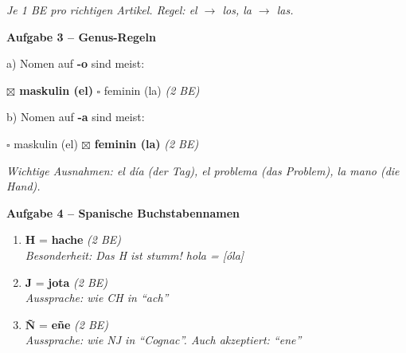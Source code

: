 \documentclass[11pt, a4paper]{article}
\newcommand{\punktebox}[1]{\hfill\fbox{\small \_\_\_/#1}}
\newcommand{\lsg}[1]{\textcolor{loesung}{\textbf{#1}}}
\begin{document}
\vspace{5pt}
\textit{Je 1 BE pro richtigen Artikel. Regel: el $\to$ los, la $\to$ las.}

\vspace{15pt}


\noindent\textbf{\textcolor{spanisch}{Aufgabe 3 -- Genus-Regeln}} \punktebox{4}

\vspace{10pt}

\noindent
a) Nomen auf \textbf{-o} sind meist:

\hspace{1cm} \lsg{$\boxtimes$ maskulin (el)} \hspace{2cm} $\square$ feminin (la) \hfill \textit{(2 BE)}

\vspace{0.8em}

\noindent
b) Nomen auf \textbf{-a} sind meist:

\hspace{1cm} $\square$ maskulin (el) \hspace{2cm} \lsg{$\boxtimes$ feminin (la)} \hfill \textit{(2 BE)}

\vspace{5pt}
\textit{Wichtige Ausnahmen: el día (der Tag), el problema (das Problem), la mano (die Hand).}

\vspace{15pt}


\noindent\textbf{\textcolor{spanisch}{Aufgabe 4 -- Spanische Buchstabennamen}} \punktebox{6}

\vspace{10pt}

\begin{enumerate}[label=\alph*)]
    \item \textbf{H} = \lsg{hache} \hfill \textit{(2 BE)} \\
    \textit{Besonderheit: Das H ist stumm! hola = [óla]}
    \item \textbf{J} = \lsg{jota} \hfill \textit{(2 BE)} \\
    \textit{Aussprache: wie CH in ``ach''}
    \item \textbf{Ñ} = \lsg{eñe} \hfill \textit{(2 BE)} \\
    \textit{Aussprache: wie NJ in ``Cognac''. Auch akzeptiert: ``ene''}
\end{enumerate}
\end{document}
